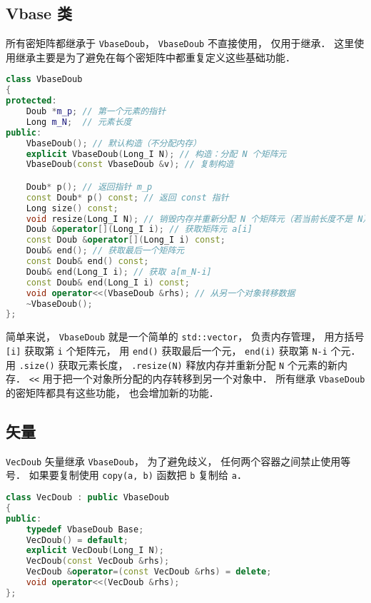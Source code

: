 \subsection{Vbase 类}
所有密矩阵都继承于 \verb|VbaseDoub|， \verb|VbaseDoub| 不直接使用， 仅用于继承． 这里使用继承主要是为了避免在每个密矩阵中都重复定义这些基础功能．
\begin{lstlisting}[language=cpp]
class VbaseDoub
{
protected:
    Doub *m_p; // 第一个元素的指针
    Long m_N;  // 元素长度
public:
    VbaseDoub(); // 默认构造（不分配内存）
    explicit VbaseDoub(Long_I N); // 构造：分配 N 个矩阵元
    VbaseDoub(const VbaseDoub &v); // 复制构造

    Doub* p(); // 返回指针 m_p
    const Doub* p() const; // 返回 const 指针
    Long size() const;
    void resize(Long_I N); // 销毁内存并重新分配 N 个矩阵元（若当前长度不是 N）
    Doub &operator[](Long_I i); // 获取矩阵元 a[i]
    const Doub &operator[](Long_I i) const; 
    Doub& end(); // 获取最后一个矩阵元
    const Doub& end() const;
    Doub& end(Long_I i); // 获取 a[m_N-i]
    const Doub& end(Long_I i) const;
    void operator<<(VbaseDoub &rhs); // 从另一个对象转移数据
    ~VbaseDoub();
};
\end{lstlisting}

简单来说， \verb|VbaseDoub| 就是一个简单的 \verb|std::vector|， 负责内存管理， 用方括号 \verb|[i]| 获取第 \verb|i| 个矩阵元， 用 \verb|end()| 获取最后一个元， \verb|end(i)| 获取第 \verb|N-i| 个元． 用 \verb|.size()| 获取元素长度， \verb|.resize(N)| 释放内存并重新分配 \verb|N| 个元素的新内存． \verb|<<| 用于把一个对象所分配的内存转移到另一个对象中． 所有继承 \verb|VbaseDoub| 的密矩阵都具有这些功能， 也会增加新的功能．

\subsection{矢量}
\verb|VecDoub| 矢量继承 \verb|VbaseDoub|， 为了避免歧义， 任何两个容器之间禁止使用等号． 如果要复制使用 \verb|copy(a, b)| 函数把 \verb|b| 复制给 \verb|a|．
\begin{lstlisting}[language=cpp]
class VecDoub : public VbaseDoub
{
public:
    typedef VbaseDoub Base;
    VecDoub() = default;
    explicit VecDoub(Long_I N);
    VecDoub(const VecDoub &rhs);
    VecDoub &operator=(const VecDoub &rhs) = delete;
    void operator<<(VecDoub &rhs);
};
\end{lstlisting}

